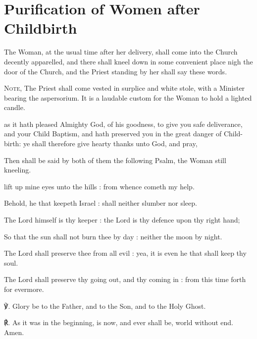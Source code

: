 \section{Purification of Women after Childbirth}
\fancyhead[RE,LO]{}
\begin{secrubric}
	The Woman, at the usual time after her delivery, shall come into the Church decently apparelled, and there shall kneel down in some convenient place nigh the door of the Church, and the Priest standing by her shall say these words.\par
	\textsc{Note,} The Priest shall come vested in surplice and white stole, with a Minister bearing the aspersorium. It is a laudable custom for the Woman to hold a lighted candle.
\end{secrubric}

 as it hath pleased Almighty God, of his goodness, to give you safe deliverance, and your Child Baptism, and hath preserved you in the great danger of Child-birth: ye shall therefore give hearty thanks unto God, and pray,
\begin{rubric}
	Then shall be said by both of them the following Psalm, the Woman still kneeling.
\end{rubric}

 lift up mine eyes unto the hills : from whence cometh my help.\par
{}
Behold, he that keepeth Israel : shall neither slumber nor sleep.\par
{}The Lord himself is thy keeper : the Lord is thy defence upon thy right hand;\par
{}So that the sun shall not burn thee by day : neither the moon by night.\par
{}The Lord shall preserve thee from all evil : yea, it is even he that shall keep thy soul.\par
{}The Lord shall preserve thy going out, and thy coming in : from this time forth for evermore.\par
℣. Glory be to the Father, and to the Son, and to the Holy Ghost.\par
℟. As it was in the beginning, is now, and ever shall be, world without end. Amen.\\

